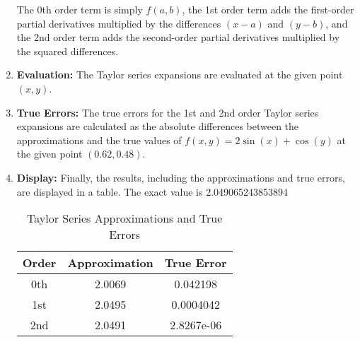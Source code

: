 \begin{enumerate}
    
    The 0th order term is simply \( f(a, b) \), the 1st order term adds the first-order partial derivatives multiplied by the differences \( (x - a) \) and \( (y - b) \), and the 2nd order term adds the second-order partial derivatives multiplied by the squared differences.
    
    \item \textbf{Evaluation:} The Taylor series expansions are evaluated at the given point \( (x, y) \).
    
    \item \textbf{True Errors:} The true errors for the 1st and 2nd order Taylor series expansions are calculated as the absolute differences between the approximations and the true values of \( f(x, y) = 2\sin(x) + \cos(y) \) at the given point \( (0.62, 0.48) \).

    \clearpage 
    
    \item \textbf{Display:} Finally, the results, including the approximations and true errors, are displayed in a table. The exact value is 2.049065243853894
        \begin{table}[h]
        \centering
        \begin{tabular}{|c|c|c|}
        \hline
        Order & Approximation & True Error \\
        \hline
        0th & 2.0069 & 0.042198 \\
        1st & 2.0495 & 0.0004042 \\
        2nd & 2.0491 & 2.8267e-06 \\
        \hline
        \end{tabular}
        \caption{Taylor Series Approximations and True Errors}
        \label{tab:taylor}

\end{table}

\end{enumerate}
